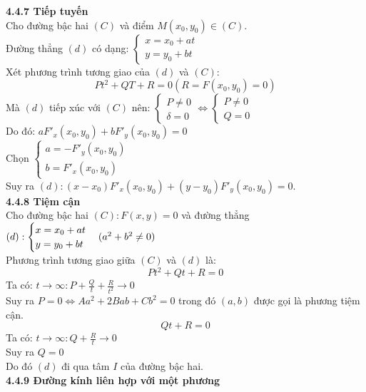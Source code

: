 \documentclass[12pt,a4]{article}
\begin{document}
\begin{titlepage}
\begin{itemize}
    \end{itemize}
    \textbf{4.4.7 Tiếp tuyến}\\
    \vspace{0.2cm}
    Cho đường bậc hai $(C)$ và điểm $M(x_0,y_0) \in (C).$\\
    Đường thẳng $(d)$ có dạng: $\begin{cases} x = x_0 + at \\ y = y_0 + bt\end{cases}$\\
    Xét phương trình tương giao của $(d)$ và $(C):$\\
    \[
    Pt^2 + QT + R = 0 (R = F(x_0,y_0) = 0)
    \]
    Mà $(d)$ tiếp xúc với $(C)$ nên: $\begin{cases} P \neq 0\\ \delta = 0\end{cases} \Leftrightarrow \begin{cases} P \neq 0\\ Q = 0\end{cases}$ \\
    Do đó: $aF'_x(x_0,y_0) + bF'_y(x_0,y_0) = 0$\\
    Chọn $\begin{cases} a = -F'_y(x_0,y_0)\\b = F'_x(x_0,y_0)\end{cases}$\\
    Suy ra $(d): (x - x_0)F'_x(x_0,y_0) + (y - y_0)F'_y(x_0,y_0) = 0.$\\
    \textbf{4.4.8 Tiệm cận}\\
    \vspace{0.2cm}
    Cho đường bậc hai $(C): F(x,y) = 0$ và đường thẳng $(d): \begin{cases}x = x_0 + at \\ y = y_0 + bt \end{cases}\\ (a^2 + b^2 \neq 0)$\\
    Phương trình tương giao giữa $(C)$ và $(d)$ là:
    \[
    Pt^2 + Qt + R = 0
    \]
    Ta có: $t \to \infty: P + \frac{Q}{t} + \frac{R}{t^2} \to 0$\\
    Suy ra $P = 0 \Leftrightarrow Aa^2 + 2Bab + Cb^2 = 0$ trong đó $(a,b)$ được gọi là phương tiệm cận.\\
    \[
    Qt + R = 0
    \]
    Ta có: $t \to \infty: Q + \frac{R}{t} \to 0$\\
    Suy ra $Q = 0$\\
    Do đó $(d)$ đi qua tâm $I$ của đường bậc hai.\\
    \textbf{4.4.9 Đường kính liên hợp với một phương}\\
    \vspace{0.2cm}\\
    \begin{center}
        \begin{tikzpicture}[scale=0.3] %


\end{tikzpicture}
\end{center}
\end{titlepage}
\end{document}
